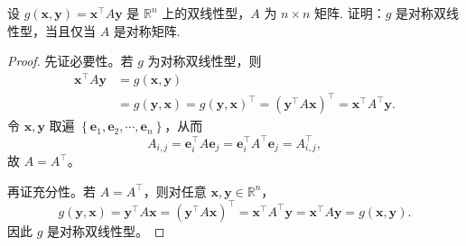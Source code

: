 设 $g \left(\boldsymbol{x}, \boldsymbol{y}\right) = \boldsymbol{x}^\top A \boldsymbol{y}$ 是 $\mathbb{R}^n$ 上的双线性型，$A$ 为 $n \times n$ 矩阵. 证明：$g$ 是对称双线性型，当且仅当 $A$ 是对称矩阵.

\begin{proof}
先证必要性。若 $g$ 为对称双线性型，则
\[
\begin{aligned}
    \boldsymbol{x}^\top A \boldsymbol{y} &= g \left(\boldsymbol{x}, \boldsymbol{y}\right) \\
    &= g \left(\boldsymbol{y}, \boldsymbol{x}\right) = g \left(\boldsymbol{y}, \boldsymbol{x}\right) ^\top = \left(\boldsymbol{y}^\top A \boldsymbol{x}\right)^\top = \boldsymbol{x}^\top A^\top \boldsymbol{y}.
\end{aligned}
\]
令 $\boldsymbol{x}, \boldsymbol{y}$ 取遍 $\left\{\boldsymbol{e}_1, \boldsymbol{e}_2, \cdots, \boldsymbol{e}_n\right\}$，从而
\[
A_{i, j} = \boldsymbol{e}_i^\top A \boldsymbol{e}_j = \boldsymbol{e}_i^\top A^\top \boldsymbol{e}_j = A^\top_{i, j},
\]
故 $A=A^\top$。

再证充分性。若 $A=A^\top$，则对任意 $\boldsymbol{x},\boldsymbol{y}\in\mathbb{R}^n$，
\[
g(\boldsymbol{y},\boldsymbol{x})
=\boldsymbol{y}^\top A\boldsymbol{x}
=\left(\boldsymbol{y}^\top A\boldsymbol{x}\right)^\top
=\boldsymbol{x}^\top A^\top\boldsymbol{y}
=\boldsymbol{x}^\top A\boldsymbol{y}
=g(\boldsymbol{x},\boldsymbol{y}).
\]
因此 $g$ 是对称双线性型。

\end{proof}
